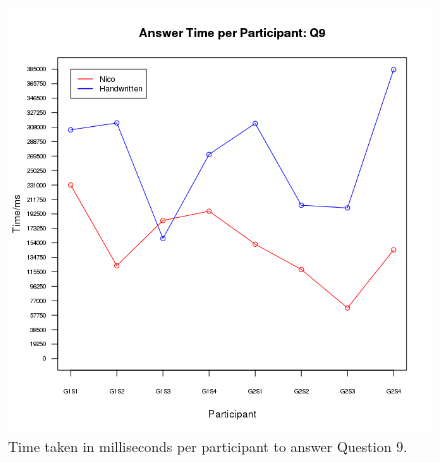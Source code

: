 \documentclass[12pt,twoside,notitlepage,xetex]{report}
\begin{document}
{\begin{center}
\begin{figure}[H]
\begin{center}
\includegraphics[height=\textheight/2-2cm]{figs/graphs/q9.png}
\end{center}
\caption{Time taken in milliseconds per participant to answer Question 9.}
\end{figure}
\end{center}

}
\end{document}
